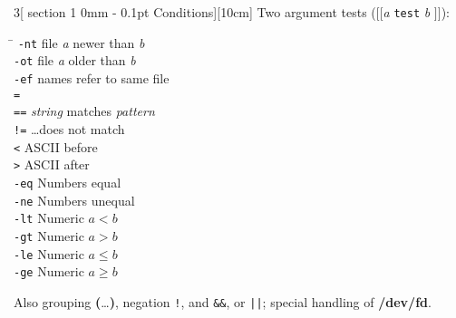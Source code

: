 \documentclass{article}
\makeatletter
\renewcommand{\section}{\@startsection
  {section}%
  {1}%
  {0mm}%
  {-\baselineskip}%
  {0.1pt}%
  {\normalfont\normalsize\scshape}} %
\newcommand\B[1]{\textbf{#1}}
\newcommand\I[1]{\textsl{#1}}
\newcommand\T[1]{\texttt{#1}}
\newcommand\Lsq{\ensuremath{\boldsymbol{[}}}
\newcommand\Rsq{\ensuremath{\boldsymbol{]}}}
\newcommand\Lpa{\textbf{(}}
\newcommand\Rpa{\textbf{)}}
\makeatother
\begin{document}
\begin{multicols}{3}[\section{Conditions}][10cm]
Two argument tests (\Lsq\Lsq \I{a} \T{test} \I{b} \Rsq\Rsq):
\begin{tabbing}
\hskip 20pt \= \kill
\T{-nt}         \> file \I{a} newer than \I{b} \\
\T{-ot}         \> file \I{a} older than \I{b} \\
\T{-ef}         \> names refer to same file \\
\T{=} \\
\T{==}          \> \I{string} matches \I{pattern} \\
\T{!=}          \> \dots does not match \\
\T{<}           \> ASCII before \\
\T{>}           \> ASCII after \\
\T{-eq}         \> Numbers equal \\
\T{-ne}         \> Numbers unequal \\
\T{-lt}         \> Numeric $a<b$ \\
\T{-gt}         \> Numeric $a>b$ \\
\T{-le}         \> Numeric $a\leq b$ \\
\T{-ge}         \> Numeric $a\geq b$ \\
\end{tabbing}

Also grouping \Lpa\dots\Rpa, negation \T{!}, and \verb!&&!, or
\verb!||!; special handling of \B{/dev/fd}.

\vfill
\end{multicols}
\end{document}
